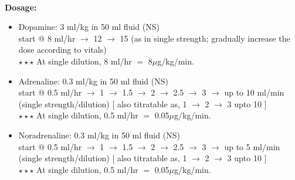 \documentclass[11pt,a4paper]{report}
\begin{document}
~\\
\noindent\textbf{Dosage:}
\begin{itemize}
	\item Dopamine: 3 ml/kg in 50 ml fluid {\color{red}(NS)} \\
	start @ 8 ml/hr $\rightarrow$ 12 $\rightarrow$ 15 (as in single strength; gradually increase the dose according to vitals)\\
	{\color{red}$\star\star\star$} At single dilution, 8 ml/hr $=$ 8$\mu$g/kg/min.
	
	\item Adrenaline: 0.3 ml/kg in 50 ml fluid {\color{red}(NS)} \\
	start @ 0.5 ml/hr $\rightarrow$ 1 $\rightarrow$ 1.5 $\rightarrow$ 2 $\rightarrow$ 2.5 $\rightarrow$ 3 $\rightarrow$  up to 10 ml/min (single strength/dilution) $[$ also titratable as, 1 $\rightarrow$ 2 $\rightarrow$ 3 upto 10 $]$\\
	{\color{red}$\star\star\star$} At single dilution, 0.5 ml/hr $=$ 0.05$\mu$g/kg/min.
	
	\item Noradrenaline: 0.3 ml/kg in 50 ml fluid {\color{red}(NS)} \\
	start @ 0.5 ml/hr $\rightarrow$ 1 $\rightarrow$ 1.5 $\rightarrow$ 2 $\rightarrow$ 2.5 $\rightarrow$ 3 $\rightarrow$  up to 5 ml/min (single strength/dilution) $[$ also titratable as, 1 $\rightarrow$ 2 $\rightarrow$ 3 upto 10 $]$\\
	{\color{red}$\star\star\star$} At single dilution, 0.5 ml/hr $=$ 0.05$\mu$g/kg/min.
\end{itemize}



\end{document}
